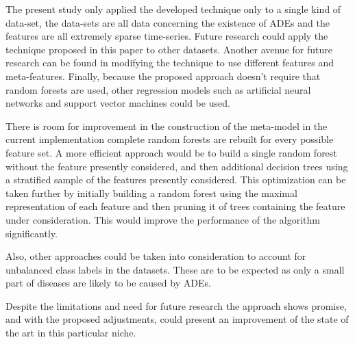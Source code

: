 \documentclass[conference]{IEEEtran}
\begin{document}
The present study only applied the developed technique only to a single kind of data-set, the data-sets are all data concerning the existence of ADEs and the features are all extremely sparse time-series. Future research could apply the technique proposed in this paper to other datasets. Another avenue for future research can be found in modifying the technique to use different features and meta-features. Finally, because the proposed approach doesn't require that random forests are used, other regression models such as artificial neural networks and support vector machines could be used.

There is room for improvement in the construction of the meta-model in the current implementation complete random forests are rebuilt for every possible feature set. A more efficient approach would be to build a single random forest without the feature presently considered, and then additional decision trees using a stratified sample of the features presently considered. This optimization can be taken further by initially building a random forest using the maximal representation of each feature and then pruning it of trees containing the feature under consideration. This would improve the performance of the algorithm significantly.


Also, other approaches could be taken into consideration to account for unbalanced class labels in the datasets. These are to be expected as only a small part of diseases are likely to be caused by ADEs.

Despite the limitations and need for future research the approach shows promise, and with the proposed adjustments, could present an improvement of the state of the art in this particular niche.
\end{document}
